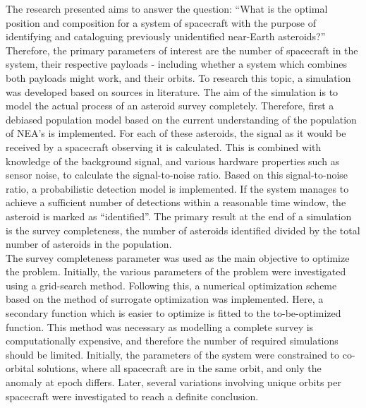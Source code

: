The research presented aims to answer the question: ``What is the optimal position and composition for a system of spacecraft with the purpose of identifying and cataloguing previously unidentified near-Earth asteroids?'' Therefore, the primary parameters of interest are the number of spacecraft in the system, their respective payloads - including whether a system which combines both payloads might work, and their orbits. To research this topic, a simulation was developed based on sources in literature. The aim of the simulation is to model the actual process of an asteroid survey completely. Therefore, first a debiased population model based on the current understanding of the population of NEA's is implemented. For each of these asteroids, the signal as it would be received by a spacecraft observing it is calculated. This is combined with knowledge of the background signal, and various hardware properties such as sensor noise, to calculate the signal-to-noise ratio. Based on this signal-to-noise ratio, a probabilistic detection model is implemented. If the system manages to achieve a sufficient number of detections within a reasonable time window, the asteroid is marked as ``identified''. The primary result at the end of a simulation is the survey completeness, the number of asteroids identified divided by the total number of asteroids in the population. \\

The survey completeness parameter was used as the main objective to optimize the problem. Initially, the various parameters of the problem were investigated using a grid-search method. Following this, a numerical optimization scheme based on the method of surrogate optimization was implemented. Here, a secondary function which is easier to optimize is fitted to the to-be-optimized function. This method was necessary as modelling a complete survey is computationally expensive, and therefore the number of required simulations should be limited. Initially, the parameters of the system were constrained to co-orbital solutions, where all spacecraft are in the same orbit, and only the anomaly at epoch differs. Later, several variations involving unique orbits per spacecraft were investigated to reach a definite conclusion. \\

